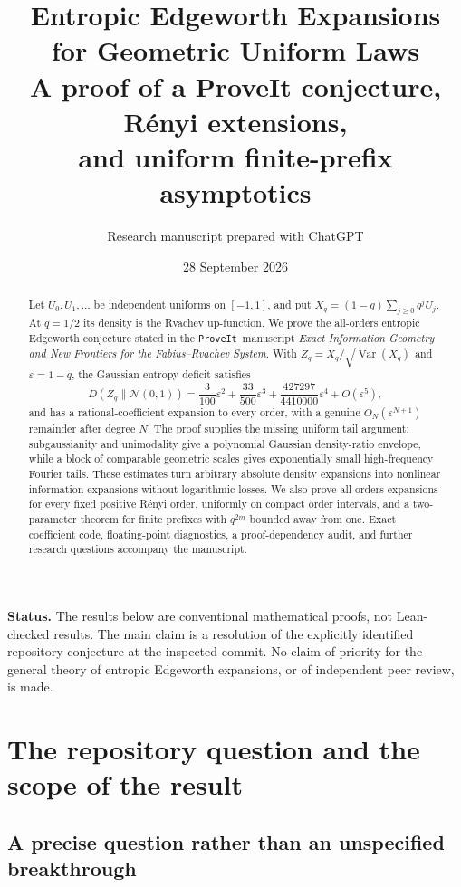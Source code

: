 \documentclass[11pt,a4paper]{article}
\title{\bfseries Entropic Edgeworth Expansions\\for Geometric Uniform Laws\\[7pt]
\large A proof of a ProveIt conjecture, R\'enyi extensions,\\and uniform finite-prefix asymptotics}
\author{Research manuscript prepared with ChatGPT}
\date{28 September 2026}
\numberwithin{equation}{section}
\theoremstyle{definition}
\theoremstyle{remark}
\newcommand{\eps}{\varepsilon}
\newcommand{\Var}{\operatorname{Var}}
\newcommand{\Normal}{\mathcal N}
\newcommand{\repo}{\texttt{ProveIt}}
\begin{document}
\maketitle
\begin{abstract}
Let $U_0,U_1,\ldots$ be independent uniforms on $[-1,1]$, and put
$X_q=(1-q)\sum_{j\ge0}q^jU_j$. At $q=1/2$ its density is the Rvachev
up-function. We prove the all-orders entropic Edgeworth conjecture stated in the
\repo\ manuscript \emph{Exact Information Geometry and New Frontiers for the
Fabius--Rvachev System}. With $Z_q=X_q/\sqrt{\Var(X_q)}$ and
$\eps=1-q$, the Gaussian entropy deficit satisfies
\[
 D(Z_q\|\Normal(0,1))
 =\frac3{100}\eps^2+\frac{33}{500}\eps^3
  +\frac{427297}{4410000}\eps^4+O(\eps^5),
\]
and has a rational-coefficient expansion to every order, with a genuine
$O_N(\eps^{N+1})$ remainder after degree $N$. The proof supplies the missing
uniform tail argument: subgaussianity and unimodality give a polynomial Gaussian
density-ratio envelope, while a block of comparable geometric scales gives
exponentially small high-frequency Fourier tails. These estimates turn arbitrary
absolute density expansions into nonlinear information expansions without
logarithmic losses. We also prove all-orders expansions for every fixed positive
R\'enyi order, uniformly on compact order intervals, and a two-parameter theorem
for finite prefixes with $q^{2m}$ bounded away from one. Exact coefficient code,
floating-point diagnostics, a proof-dependency audit, and further research
questions accompany the manuscript.
\end{abstract}

\noindent\textbf{Status.} The results below are conventional mathematical proofs,
not Lean-checked results. The main claim is a resolution of the explicitly
identified repository conjecture at the inspected commit. No claim of priority
for the general theory of entropic Edgeworth expansions, or of independent
peer review, is made.

\newpage
\tableofcontents
\newpage

\section{The repository question and the scope of the result}
\label{sec:scope}

\subsection{A precise question rather than an unspecified breakthrough}
\end{document}
